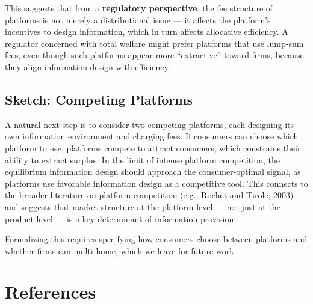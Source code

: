 \documentclass[12pt, a4paper]{article}
\begin{document}
This suggests that from a \textbf{regulatory perspective}, the fee structure of platforms is not merely a distributional issue --- it affects the platform's incentives to design information, which in turn affects allocative efficiency. A regulator concerned with total welfare might prefer platforms that use lump-sum fees, even though such platforms appear more ``extractive'' toward firms, because they align information design with efficiency.

\subsection{Sketch: Competing Platforms}

A natural next step is to consider two competing platforms, each designing its own information environment and charging fees. If consumers can choose which platform to use, platforms compete to attract consumers, which constrains their ability to extract surplus. In the limit of intense platform competition, the equilibrium information design should approach the consumer-optimal signal, as platforms use favorable information design as a competitive tool. This connects to the broader literature on platform competition (e.g., Rochet and Tirole, 2003) and suggests that market structure at the platform level --- not just at the product level --- is a key determinant of information provision.

Formalizing this requires specifying how consumers choose between platforms and whether firms can multi-home, which we leave for future work.

\section*{References}
\end{document}
